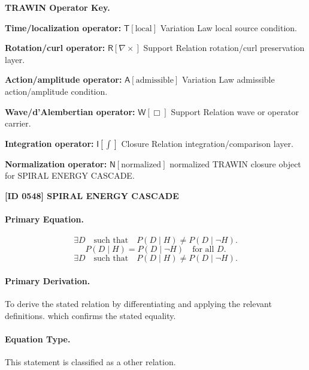 \par\vspace{0.45\baselineskip}
\noindent\begin{minipage}[t]{\linewidth}
\begingroup
\small
\raggedright
\textbf{TRAWIN Operator Key.}\par
\noindent\textbf{Time/localization operator:} $\mathsf{T}\!\left[\mathrm{local}\right]$ Variation Law local source condition.\par
\noindent\textbf{Rotation/curl operator:} $\mathsf{R}\!\left[\nabla\times\right]$ Support Relation rotation/curl preservation layer.\par
\noindent\textbf{Action/amplitude operator:} $\mathsf{A}\!\left[\mathrm{admissible}\right]$ Variation Law admissible action/amplitude condition.\par
\noindent\textbf{Wave/d'Alembertian operator:} $\mathsf{W}\!\left[\Box\right]$ Support Relation wave or operator carrier.\par
\noindent\textbf{Integration operator:} $\mathsf{I}\!\left[\int\right]$ Closure Relation integration/comparison layer.\par
\noindent\textbf{Normalization operator:} $\mathsf{N}\!\left[\mathrm{normalized}\right]$ normalized TRAWIN closure object for SPIRAL ENERGY CASCADE.\par
\endgroup
\end{minipage}

\clearpage
\noindent\textbf{[ID 0548] SPIRAL ENERGY CASCADE}\par
\vspace{0.35em}
\paragraph{Primary Equation.}
\[
\exists D \quad\text{such that}\quad P(D\mid H)\neq P(D\mid \neg H).
\]
\[
P(D\mid H)=P(D\mid \neg H) \quad \text{for all }D.
\]
\[
\boxed{ \exists D \quad\text{such that}\quad P(D\mid H)\neq P(D\mid \neg H). }
\]

\paragraph{Primary Derivation.}
To derive the stated relation by differentiating and applying the relevant definitions. which confirms the stated equality.
\paragraph{Equation Type.}
This statement is classified as a other relation.


